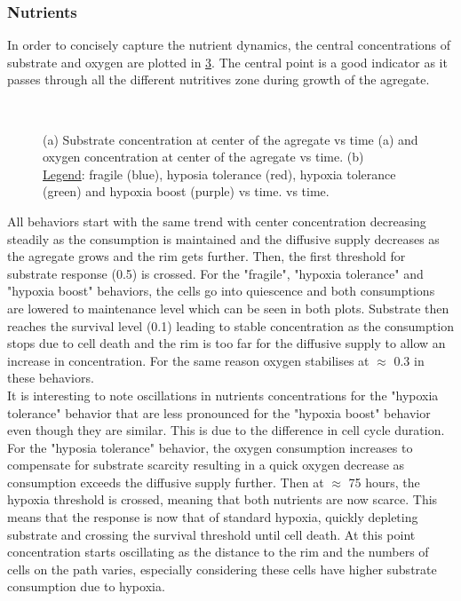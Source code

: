 \documentclass[11pt,a4paper]{article}
\begin{document}
\subsubsection{Nutrients}
In order to concisely capture the nutrient dynamics, the central concentrations of substrate and oxygen are plotted in \ref{OS_nutrients_Id}. The central point is a good indicator as it passes through all the different nutritives zone during growth of the agregate.
\begin{figure}[h]
\begin{subfigure}{0.5\textwidth}
	\centering
	
	\caption{ \label{OS_S_Id}}
\end{subfigure}
~~
\begin{subfigure}{0.5\textwidth}
	\centering
	
	\caption{\label{OS_O_Id}}
\end{subfigure}
\caption{(a) Substrate concentration at center of the agregate  vs time (a) and oxygen concentration at center of the agregate  vs time. (b) \\
\underline{Legend}: fragile (blue), hyposia tolerance (red), hypoxia tolerance (green) and hypoxia boost (purple) vs time. vs time. \label{OS_nutrients_Id}}
\end{figure}

All behaviors start with the same trend with center concentration decreasing steadily as the consumption is maintained and the diffusive supply decreases as the agregate grows and the rim gets further. Then, the first threshold for substrate response (0.5) is crossed. For the "fragile", "hypoxia tolerance" and "hypoxia boost" behaviors, the cells go into quiescence and both consumptions are lowered to maintenance level which can be seen in both plots. Substrate then reaches the survival level (0.1) leading to stable concentration as the consumption stops due to cell death and the rim is too far for the diffusive supply to allow an increase in concentration. For the same reason oxygen stabilises at $\approx$ 0.3 in these behaviors.\\ 

It is interesting to note oscillations in nutrients concentrations for the "hypoxia tolerance" behavior that are less pronounced for the "hypoxia boost" behavior even though they are similar. This is due to the difference in cell cycle duration.\\

For the "hyposia tolerance" behavior, the oxygen consumption increases to compensate for substrate scarcity resulting in a quick oxygen decrease as consumption exceeds the diffusive supply further. Then at $\approx$ 75 hours, the hypoxia threshold is crossed, meaning that both nutrients are now scarce. This means that the response is now that of standard hypoxia, quickly depleting substrate and crossing the survival threshold until cell death. At this point concentration starts oscillating as the distance to the rim and the numbers of cells on the path varies, especially considering these cells have higher substrate consumption due to hypoxia.
\end{document}
